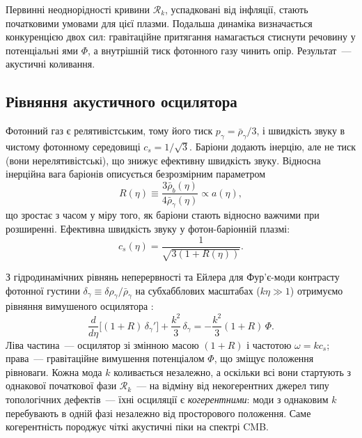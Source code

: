 \documentclass[12pt, a4paper]{article}
\begin{document}
Первинні неоднорідності кривини $\mathcal{R}_k$, успадковані
від інфляції, стають початковими умовами для цієї плазми.
Подальша динаміка визначається конкуренцією двох сил:
гравітаційне притягання намагається стиснути речовину у
потенціальні ями $\Phi$, а внутрішній тиск фотонного газу
чинить опір. Результат~--- акустичні коливання.

\subsection{Рівняння акустичного осцилятора}

Фотонний газ є релятивістським, тому його тиск
$p_\gamma = \bar{\rho}_\gamma / 3$, і швидкість звуку в
чистому фотонному середовищі $c_s = 1/\sqrt{3}$. Баріони
додають інерцію, але не тиск (вони нерелятивістські), що
знижує ефективну швидкість звуку. Відносна інерційна вага
баріонів описується безрозмірним параметром
\begin{equation*}
  R(\eta) \equiv \frac{3\bar{\rho}_b(\eta)}{4\bar{\rho}_\gamma(\eta)}
           \propto a(\eta),
\end{equation*}
що зростає з часом у міру того, як баріони стають
відносно важчими при розширенні. Ефективна швидкість
звуку у фотон-баріонній плазмі:
\begin{equation}\label{eq:sound_speed}
  c_s(\eta) = \frac{1}{\sqrt{3(1 + R(\eta))}}.
\end{equation}

З гідродинамічних рівнянь неперервності та Ейлера для
Фур'є-моди контрасту фотонної густини
$\delta_\gamma \equiv \delta\rho_\gamma/\bar{\rho}_\gamma$
на субхабблових масштабах ($k\eta \gg 1$) отримуємо
рівняння вимушеного осцилятора \cite{dodelson_2020}:
\begin{equation}\label{eq:acoustic_oscillator}
  \frac{d}{d\eta}\bigl[(1+R)\,\delta_\gamma'\bigr]
  + \frac{k^2}{3}\,\delta_\gamma
  = -\frac{k^2}{3}(1+R)\,\Phi.
\end{equation}
Ліва частина~--- осцилятор зі змінною масою $(1+R)$
і частотою $\omega = kc_s$; права~--- гравітаційне
вимушення потенціалом $\Phi$, що зміщує положення
рівноваги. Кожна мода $k$ коливається незалежно, а
оскільки всі вони стартують з однакової початкової фази
$\mathcal{R}_k$~--- на відміну від некогерентних джерел
типу топологічних дефектів~--- їхні осциляції є
\emph{когерентними}: моди з однаковим $k$ перебувають
в одній фазі незалежно від просторового положення.
Саме когерентність породжує чіткі акустичні піки
на спектрі CMB.
\end{document}
